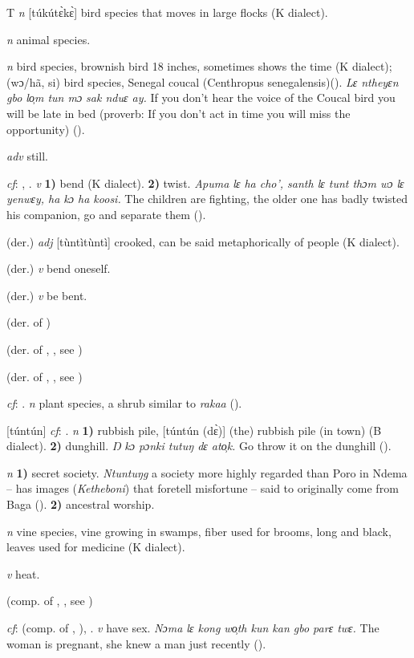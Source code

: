 \begin{letter}{T}
 \textit{n} [túkútɛ̀kɛ̀] bird species that moves in large flocks (K dialect). 

 \textit{n} animal species.

 \textit{n} bird species, brownish bird 18 inches, sometimes shows the time (K dialect); (wɔ/hã, si) bird species, Senegal coucal (Centhropus senegalensis)(\citealt{Pichl1967}). \textit{Lɛ ntheyɛn gbo lo̹m tun mɔ sak nduɛ ay.} If you don't hear the voice of the Coucal bird you will be late in bed (proverb: If you don't act in time you will miss the opportunity) (\citealt{Pichl1967}). 

 \textit{adv} still.

 \textit{cf}: , . \textit{v} \textbf{1)} bend (K dialect). \textbf{2)} twist. \textit{Apuma lɛ ha cho', santh lɛ tunt thɔm wɔ lɛ yenwɛy, ha kɔ ha koosi.} The children are fighting, the older one has badly twisted his companion, go and separate them (\citealt{Pichl1967}).

 (der.) \textit{adj} [tùntìtùntì] crooked, can be said metaphorically of people (K dialect).

 (der.) \textit{v} bend oneself.

 (der.) \textit{v} be bent.

 (der. of ) 

 (der. of , , see ) 

 (der. of , , see ) 

 \textit{cf}: . \textit{n} plant species, a shrub similar to \textit{rakaa} (\citealt{Pichl1967}). 

 [túntún] \textit{cf}: . \textit{n} \textbf{1)} rubbish pile, [túntún (dɛ̀)] (the) rubbish pile (in town) (B dialect). \textbf{2)} dunghill. \textit{Ŋ kɔ pɔnki tutuŋ dɛ ato̹k.} Go throw it on the dunghill (\citealt{Pichl1967}). 

 \textit{n} \textbf{1)} secret society. \textit{Ntuntuŋg} a society more highly regarded than Poro in Ndema – has images (\textit{Ketheboni}) that foretell misfortune – said to originally come from Baga (\citealt{Hall1938}). \textbf{2)} ancestral worship.

 \textit{n} vine species, vine growing in swamps, fiber used for brooms, long and black, leaves used for medicine (K dialect). 

 \textit{v} heat.

 (comp. of , , see ) 

 \textit{cf}:  (comp. of , ), . \textit{v} have sex. \textit{Nɔma lɛ kong wo̹th kun kan gbo parɛ twɛ.} The woman is pregnant, she knew a man just recently (\citealt{Pichl1967}). 

\end{letter}

